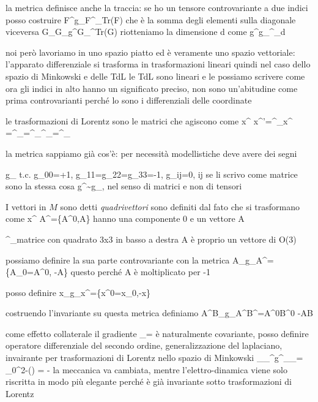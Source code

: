 {{la metrica definisce anche la traccia:
	se ho un tensore controvariante a due indici posso costruire
	F^{\alpha\beta}g_{\alpha\beta}\equiv F^\alpha_\alpha \equiv Tr(F) che è la somma degli elementi sulla diagonale
viceversa
	G_{\alpha\beta}\rightarrow G_{\alpha\beta}g^{\alpha\beta}\equiv G_\alpha^\alpha\equiv Tr(G)
riotteniamo la dimensione d come
	g^{\alpha\beta}g_{\alpha\beta}\equiv \delta^\alpha_\alpha\equiv d
	
	
noi però lavoriamo in uno spazio piatto ed è veramente uno spazio vettoriale: l'apparato differenziale si trasforma in trasformazioni lineari
quindi nel caso dello spazio di Minkowski e delle TdL le TdL sono lineari e le possiamo scrivere come
ora gli indici in alto hanno un significato preciso, non sono un'abitudine come prima
controvarianti perché lo sono i differenziali delle coordinate

le trasformazioni di Lorentz sono le matrici \Lambda che agiscono come
	x^\alpha \stackrel{\Lambda}{\rightarrow} x^\alpha'=\Lambda^\alpha_\beta x^\beta
	=\Lambda^\alpha_\beta{}=\Lambda^\alpha_\beta \delta^\beta_\sigma=\Lambda^\alpha_\sigma
	
la metrica sappiamo già cos'è: per necessità modellistiche deve avere dei segni

	g_{\alpha\beta} t.c. g_{00}=+1, g_{11}=g_{22}=g_{33}=-1, g_{ij}=0, \forall i\neq j
se li scrivo come matrice sono la stessa cosa	
	g^{\alpha}\sim g_{\alpha\beta}, nel senso di matrici e non di tensori
	
	
I vettori in $M$ sono detti \textit{quadrivettori}
sono definiti dal fato che si trasformano come x^\mu
	A^\mu=\{A^0,\vba A\}
hanno una componente 0 e un vettore \vba A

	\Lambda^\alpha_\beta \rightarrow matrice con quadrato 3x3 in basso a destra
	\vba A è proprio un vettore di O(3)

possiamo definire la sua parte controvariante con la metrica
	A_{\mu}\equiv g_{\mu\nu}A^\nu=\{A_0=A^0, -\vba A\}
questo perché \vba A è moltiplicato per -1

posso definire
	x_\mu\equiv g_{\mu\nu}x^\nu=\{x^0=x_0,-\vba x\}
	
costruendo l'invariante su questa metrica definiamo
	A^\mu B_\mu \equiv g_{\mu\nu}A^\mu B^\nu=A^0B^0 -\vba A\vdot \vba B
	
come effetto collaterale il gradiente \partial_\mu= è naturalmente covariante, posso definire operatore differenziale del secondo ordine, generalizzazione del laplaciano, invairante per trasformazioni di Lorentz nello spazio di Minkowski
	\partial_\mu\rightarrow\partial_\mu\partia^\mu\equiv g^{\mu\nu}\partial_\mu\partial_\nu= \partial_0^2-(\laplacian) =  -\laplacian
la meccanica va cambiata, mentre l'elettro-dinamica viene solo riscritta in modo più elegante perché è già invariante sotto trasformazioni di Lorentz

}}
